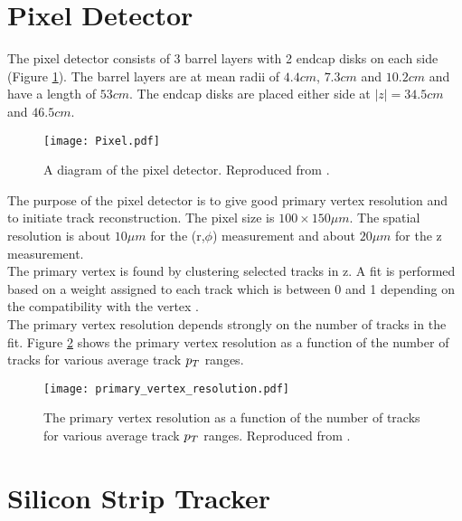\section{Pixel Detector}

The pixel detector consists of 3 barrel layers with 2 endcap disks on each side
(Figure \ref{fig:Pixel}). The barrel layers are at mean radii of $4.4\unit{cm}$,
$7.3\unit{cm}$ and $10.2\unit{cm}$ and have a length of $53\unit{cm}$. The 
endcap disks are placed either side at $|z| = 34.5\unit{cm}$ and 
$46.5\unit{cm}$. \\

\begin{figure}
\texttt{[image: Pixel.pdf]}
\caption{A diagram of the pixel detector. Reproduced from \cite{physics_tdr_1}.}
\label{fig:Pixel}
\end{figure}

The purpose of the pixel detector is to give good primary vertex resolution and
to initiate track reconstruction. The pixel size is $100\times150\unit{\mu m}$. 
The spatial resolution is about $10\unit{\mu m}$ for the (r,$\phi$) measurement 
and about $20\unit{\mu m}$ for the z measurement. \\

The primary vertex is found by clustering selected tracks in z. A fit is
performed based on a weight assigned to each track which is between 0 and 1
depending on the compatibility with the vertex \cite{primary_vertex}. \\

The primary vertex resolution depends strongly on the number of tracks in the
fit. Figure \ref{fig:primary_vertex} shows the primary vertex resolution as a
function of the number of tracks for various average track $p_{T}$ ranges.

\begin{figure}
\begin{center}
\texttt{[image: primary\_vertex\_resolution.pdf]}
\end{center}
\caption{The primary vertex resolution as a function of the number of tracks for
various average track $p_{T}$ ranges. Reproduced from \cite{primary_vertex}.}
\label{fig:primary_vertex}
\end{figure}

\section{Silicon Strip Tracker}

